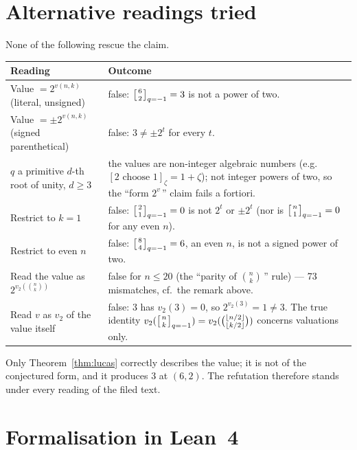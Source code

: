 \documentclass[11pt]{article}
\theoremstyle{definition}
\theoremstyle{remark}
\newcommand{\qbinm}[2]{\left[\genfrac{}{}{0pt}{}{#1}{#2}\right]_{q=-1}}
\begin{document}
\section{Alternative readings tried}

None of the following rescue the claim.

\begin{center}
\begin{tabular}{p{} p{}}
\toprule
Reading & Outcome \\
\midrule
Value $=2^{v(n,k)}$ (literal, unsigned) & false: $\qbinm{6}{2}=3$ is not a
  power of two. \\
Value $=\pm 2^{v(n,k)}$ (signed parenthetical) & false: $3\neq\pm 2^{t}$ for
  every $t$. \\
$q$ a primitive $d$-th root of unity, $d\ge 3$ & the values are non-integer
  algebraic numbers (e.g.\ $[2 \text{ choose } 1]_{\zeta}=1+\zeta$); not
  integer powers of two, so the ``form $2^{v}$\,'' claim fails a fortiori. \\
Restrict to $k=1$ & false: $\qbinm{2}{1}=0$ is not $2^{t}$ or $\pm 2^{t}$
  (nor is $\qbinm{n}{1}=0$ for any even $n$). \\
Restrict to even $n$ & false: $\qbinm{8}{4}=6$, an even $n$, is not a signed
  power of two. \\
Read the value as $2^{v_{2}(\binom{n}{k})}$ & false for $n\le 20$ (the
  ``parity of $\binom{n}{k}$\,'' rule) --- 73 mismatches, cf.\ the remark
  above. \\
Read $v$ as $v_{2}$ of the value itself & false: $3$ has $v_{2}(3)=0$, so
  $2^{v_{2}(3)}=1\neq 3$. The true identity
  $v_{2}(\qbinm{n}{k})=v_{2}(\binom{\lfloor n/2\rfloor}{\lfloor k/2\rfloor})$
  concerns valuations only. \\
\bottomrule
\end{tabular}
\end{center}

Only Theorem~\ref{thm:lucas} correctly describes the value; it is not of the
conjectured form, and it produces $3$ at $(6,2)$. The refutation therefore
stands under every reading of the filed text.

\section{Formalisation in Lean~4}
\end{document}
